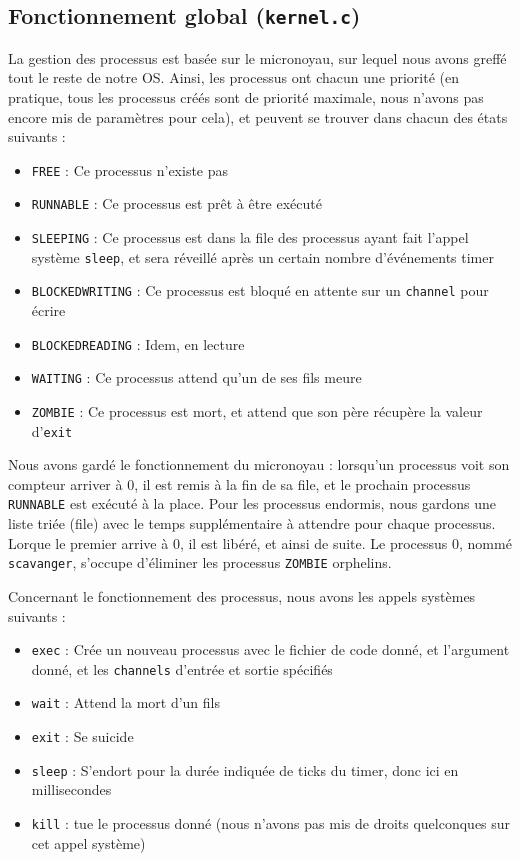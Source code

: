 \documentclass[a4paper,10pt, french]{article}
\newcommand{\code}[1]{\texttt{#1}}
\begin{document}
\subsection{Fonctionnement global (\code{kernel.c})}
La gestion des processus est basée sur le micronoyau, sur lequel nous avons greffé tout le reste de notre OS.
Ainsi, les processus ont chacun une priorité (en pratique, tous les processus créés sont de priorité maximale, nous
n'avons pas encore mis de paramètres pour cela), et peuvent se trouver dans chacun des états suivants :
\begin{itemize}
 \item \code{FREE} : Ce processus n'existe pas
 \item \code{RUNNABLE} : Ce processus est prêt à être exécuté
 \item \code{SLEEPING} : Ce processus est dans la file des processus ayant fait l'appel système \code{sleep}, et sera 
 réveillé après un certain nombre d'événements timer
 \item \code{BLOCKEDWRITING} : Ce processus est bloqué en attente sur un \code{channel} pour écrire
 \item \code{BLOCKEDREADING} : Idem, en lecture
 \item \code{WAITING} : Ce processus attend qu'un de ses fils meure
 \item \code{ZOMBIE} : Ce processus est mort, et attend que son père récupère la valeur d'\code{exit}
\end{itemize}

Nous avons gardé le fonctionnement du micronoyau : lorsqu'un processus voit son compteur arriver à 0,
il est remis à la fin de sa file, et le prochain processus \code{RUNNABLE} est exécuté à la place. Pour les 
processus endormis, nous gardons une liste triée (file) avec le temps supplémentaire à attendre pour chaque processus.
Lorque le premier arrive à 0, il est libéré, et ainsi de suite. Le processus 0, nommé \code{scavanger},
s'occupe d'éliminer les processus \code{ZOMBIE} orphelins.

Concernant le fonctionnement des processus, nous avons les appels systèmes suivants :
\begin{itemize}
 \item \code{exec} : Crée un nouveau processus avec le fichier de code donné, et l'argument donné,
 et les \code{channels} d'entrée et sortie spécifiés
 \item \code{wait} : Attend la mort d'un fils
 \item \code{exit} : Se suicide
 \item \code{sleep} : S'endort pour la durée indiquée de ticks du timer, donc ici en millisecondes
 \item \code{kill} : tue le processus donné (nous n'avons pas mis de droits quelconques sur cet appel système)
\end{itemize}
\end{document}
